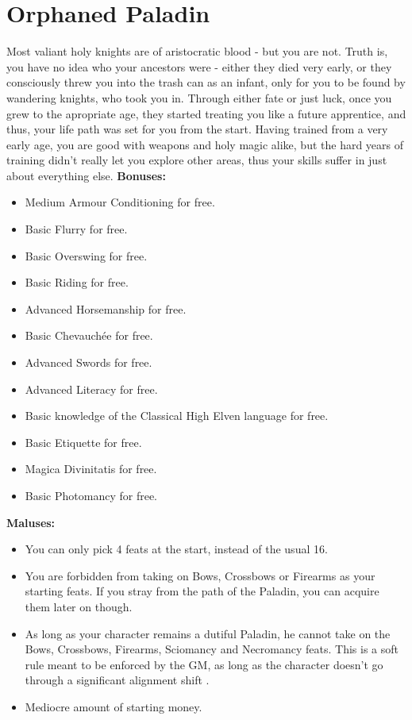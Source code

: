 \section{Orphaned Paladin}
Most valiant holy knights are of aristocratic blood - but you are not. Truth is, you have no idea who your ancestors were - either they died very early, or they consciously threw you into the trash can as an infant, only for you to be found by wandering knights, who took you in. Through either fate or just luck, once you grew to the apropriate age, they started treating you like a future apprentice, and thus, your life path was set for you from the start. Having trained from a very early age, you are good with weapons and holy magic alike, but the hard years of training didn't really let you explore other areas, thus your skills suffer in just about everything else.\newline
\textbf{Bonuses:}
\begin{itemize}
	\item Medium Armour Conditioning for free.
	\item Basic Flurry for free.
	\item Basic Overswing for free.
	\item Basic Riding for free.
	\item Advanced Horsemanship for free.
	\item Basic Chevauchée for free.
	\item Advanced Swords for free.
	\item Advanced Literacy  for free.
	\item Basic knowledge of the Classical High Elven language  for free.
	\item Basic Etiquette for free.
	\item Magica Divinitatis for free.
	\item Basic Photomancy for free.
\end{itemize}
\textbf{Maluses:}
\begin{itemize}
	\item You can only pick 4 feats at the start, instead of the usual 16.
	\item You are forbidden from taking on Bows, Crossbows or Firearms as your starting feats. If you stray from the path of the Paladin, you can acquire them later on though.
	\item As long as your character remains a dutiful Paladin, he cannot take on the Bows, Crossbows, Firearms, Sciomancy and Necromancy feats. This is a soft rule meant to be enforced by the GM, as long as the character doesn't go through a significant alignment shift .
	\item Mediocre amount of starting money.
\end{itemize}
